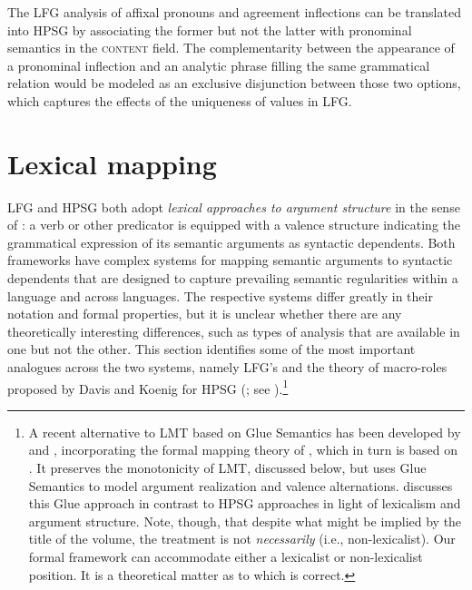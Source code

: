 The LFG analysis of  affixal pronouns and agreement inflections can be translated into HPSG by associating the former but not the latter with pronominal semantics in the \textsc{content} field.  
The complementarity between the appearance of a pronominal inflection and an analytic phrase filling the same grammatical relation would be modeled as an exclusive disjunction between those two options, which captures the effects of the uniqueness of  values in LFG.  
                  
                  
\section{Lexical mapping}
LFG and HPSG both adopt \textit{lexical approaches to argument structure} in the sense of \citet{MWArgSt}: a verb or other predicator is equipped with a valence structure indicating the grammatical expression of its semantic arguments as syntactic dependents.  Both frameworks have complex systems for mapping semantic arguments to syntactic dependents that are designed to capture prevailing semantic regularities within a language and across languages.   The respective systems differ greatly in their notation and formal properties, but it is unclear whether 
there are any theoretically interesting differences, such as types of analysis that are available in one but not the other.  This section identifies some of the most important  analogues across the two systems, namely LFG's  \citep[LMT;][Chapter 14]{BATW2016a} and the theory of macro-roles proposed by Davis and Koenig for HPSG (\citealt{Davis96a-u,DK2000b-u}; see ).\footnote{A recent alternative to LMT based on Glue Semantics has been developed by \citet{asudeh;giorgolo-lfg12} and \citet{asudeh;ea14-lfg}, incorporating the formal mapping theory of \citet{findlay16}, which in turn is based on \citet{kibort07}. It preserves the monotonicity of LMT, discussed below, but uses Glue Semantics to model argument realization and valence alternations. \citet{MuellerLFGphrasal} discusses this Glue approach in contrast to HPSG approaches in light of lexicalism and argument structure. Note, though, that despite what might be implied by the title of the \citeauthor{MuellerLFGphrasal} volume, the \citeauthor{asudeh;ea14-lfg} treatment is not \emph{necessarily}  (i.e., non-lexicalist). Our formal framework can accommodate either a lexicalist or non-lexicalist position. It is a theoretical matter as to which is correct.}
 
